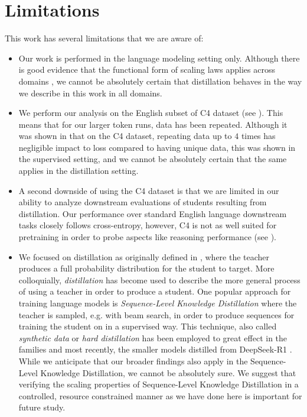 \section{Limitations}
\label{sec:limitations}
This work has several limitations that we are aware of:
\begin{itemize}
    \item Our work is performed in the language modeling setting only. 
    Although there is good evidence that the functional form of scaling laws applies across domains \citep{DBLP:journals/corr/abs-2010-14701},
    we cannot be absolutely certain that distillation behaves in the way we describe in this work in all domains.
    \item We perform our analysis on the English subset of C4 dataset (see ).
    This means that for our larger token runs, data has been repeated.
    Although it was shown in \citet{DBLP:conf/nips/MuennighoffRBST23} that on the C4 dataset, repeating data up to $4$ times has negligible impact to loss compared to having unique data,
    this was shown in the supervised setting,
    and we cannot be absolutely certain that the same applies in the distillation setting.
    \item A second downside of using the C4 dataset is that we are limited in our ability to analyze downstream evaluations of students resulting from distillation. Our performance over standard English language downstream tasks closely follows cross-entropy, however, C4 is not as well suited for pretraining in order to probe aspects like reasoning performance (see ).
    \item We focused on distillation as originally defined in \citet{DBLP:journals/corr/HintonVD15},
    where the teacher produces a full probability distribution for the student to target.
    More colloquially, \emph{distillation} has become 
    used to describe the more general process of using a teacher in order to produce a student.
    One popular approach for training language models is \emph{Sequence-Level Knowledge Distillation} \citep{DBLP:conf/emnlp/KimR16}
    where the teacher is sampled, e.g. with beam search, in order to produce sequences 
    for training the student on in a supervised way.
    This technique,
    also called \emph{synthetic data} or \emph{hard distillation} has been employed to great effect in the \llama families 
    \citep{DBLP:journals/corr/abs-2302-13971} and most recently, 
    the smaller models distilled from DeepSeek-R1 \citep{DBLP:journals/corr/abs-2412-19437}.
    While we anticipate that our broader findings also apply in the Sequence-Level Knowledge Distillation, we cannot be absolutely sure.
    We suggest that verifying the scaling properties of Sequence-Level Knowledge Distillation
    in a controlled, resource constrained manner as we have done here is important for future study.
    \end{itemize}
